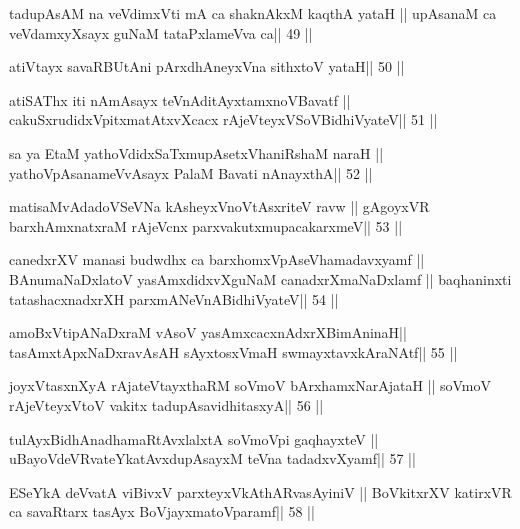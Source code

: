 \begin{shl}
tadupAsAM na veVdimxVti mA ca shaknAkxM kaqthA yataH ||
upAsanaM ca veVdamxyXsayx guNaM tataPxlameVva ca\hfill || 49 ||
\end{shl}

\begin{shl}
atiVtayx savaRBUtAni pArxdhAneyxVna sithxtoV yataH\hfill || 50 ||
\end{shl}

\begin{shl}
atiSAThx iti nAmAsayx teVnA\s\s ditAyxtamxnoV\s Bavatf ||
cakuSxrudidxVpitxmatAtxvXcacx rAjeVteyxVSoV\s BidhiVyateV\hfill || 51 ||
\end{shl}

\begin{shl}
sa ya EtaM yathoVdidxSaTxmupAsetxV\s haniRshaM naraH ||
yathoVpAsanameVvAsayx PalaM Bavati nAnayxthA\hfill || 52 ||
\end{shl}

\begin{shl}
matisaMvAdadoVSeVNa kAsheyxVnoVtAsxriteV ravw ||
gAgoyxVR barxhAmxnatxraM rAjeVcnx parxvakutxmupacakarxmeV\hfill || 53 ||
\end{shl}

\begin{shl}
canedxrXV manasi budwdhx ca barxhomxVpAseV\s hamadavxyamf ||
BAnumaNaDxlatoV yasAmxdidxvXguNaM canadxrXmaNaDxlamf ||
baqhaninxti tatashacxnadxrXH parxmANeVnABidhiVyateV\hfill || 54 ||
\end{shl}

\begin{shl}
amoBxV\s tipANaDxraM vAsoV yasAmxcacxnAdxrXBimAninaH||
tasAmxtApxNaDxravAsAH sAyxtosxVmaH swmayxtavxkAraNAtf\hfill || 55 ||
\end{shl}

\begin{shl}
joyxVtasxnXyA rAjateV\s tayxthaRM soVmoV bArxhamxNarAjataH ||
soVmoV rAjeVteyxVtoV vakitx tadupAsavidhitasxyA\hfill || 56 ||
\end{shl}

\begin{shl}
tulAyxBidhAnadhamaRtAvxlalxtA soVmoV\s pi gaqhayxteV ||
uBayoVdeVRvateYkatAvxdupAsayxM teVna tadadxvXyamf\hfill || 57 ||
\end{shl}

\begin{shl}
ESeYkA deVvatA viBivxV parxteyxVkAthARvasAyiniV ||
BoVkitxrXV katirxVR ca savaRtarx tasAyx BoVjayxmatoV\s paramf\hfill || 58 ||
\end{shl}


